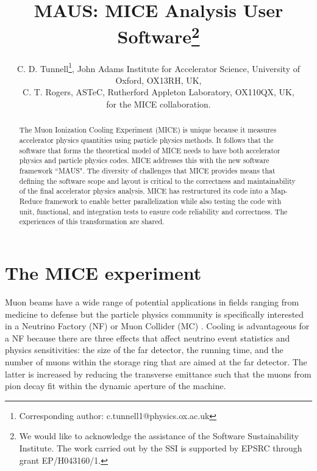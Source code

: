 \documentclass{JAC2003}
\begin{document}
\title{MAUS: MICE Analysis User Software\thanks{We would like to acknowledge the assistance of the Software Sustainability Institute. The work carried out by the SSI is supported by EPSRC through grant EP/H043160/1.}}

\author{C. D. Tunnell\thanks{Corresponding author: c.tunnell1@physics.ox.ac.uk }, John Adams Institute for Accelerator Science, University of Oxford, OX13RH, UK,\\ 
C. T. Rogers, ASTeC, Rutherford Appleton Laboratory, OX110QX, UK,\\ for the MICE collaboration.}

\maketitle

\begin{abstract}
      The  Muon Ionization Cooling Experiment (MICE) is unique because it measures accelerator physics quantities using particle physics methods.  It follows that the software that forms the theoretical model of MICE needs to have both accelerator physics and particle physics codes.  MICE addresses this with the new software framework ``MAUS".  The diversity of challenges that MICE provides  means that defining the software scope and layout is critical to the correctness and maintainability of the final accelerator physics analysis.  MICE has restructured its code into a Map-Reduce framework to enable better parallelization while also testing the code with unit, functional, and integration tests to ensure code reliability and correctness.  The experiences of this transformation are shared.
\end{abstract}

\section{The MICE experiment}

Muon beams have a wide range of potential applications in fields ranging from medicine to defense but the particle physics community is specifically interested in a Neutrino Factory (NF) or Muon Collider (MC) \cite{nfmc}.  Cooling is advantageous for a NF because there are three effects that affect neutrino event statistics and physics sensitivities: the size of the far detector, the running time, and the number of muons within the storage ring that are aimed at the far detector.   The latter is increased by reducing the transverse emittance such that the muons from pion decay fit within the dynamic aperture of the machine.
\end{document}
